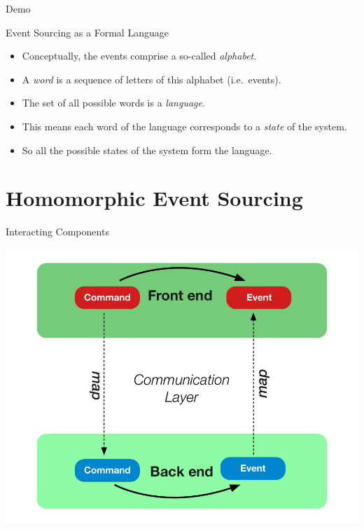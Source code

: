 \begin{frame}[fragile]{}
\begin{center}
\Huge
Demo
\end{center}
\end{frame}


\begin{frame}[fragile]{Event Sourcing as a Formal Language}

\begin{itemize}[<+->]
\item Conceptually, the events comprise a so-called \textit{alphabet}.
\item A \textit{word} is a sequence of letters of this alphabet (i.e.~events).
\item The set of all possible words is a \textit{language}.
\item This means each word of the language corresponds to a \textit{state} of the system.
\item So all the possible states of the system form the language.
\end{itemize}

\end{frame}

\part{Homomorphic Event Sourcing}

\begin{frame}[fragile]{Interacting Components}
\begin{center}
\includegraphics[height=.8\textheight]{./images/interaction-loop.pdf}
\end{center}
\end{frame}

